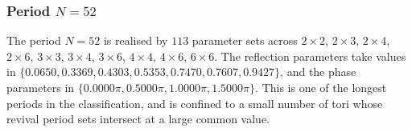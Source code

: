 \par
\subsubsection{Period $N = 52$}
The period $N=52$ is realised by $113$ parameter sets across $2\times2$, $2\times3$, $2\times4$, $2\times6$, $3\times3$, $3\times4$, $3\times6$, $4\times4$, $4\times6$, $6\times6$. The reflection parameters take values in $\{0.0650, 0.3369, 0.4303, 0.5353, 0.7470, 0.7607, 0.9427\}$, and the phase parameters in $\{0.0000\pi, 0.5000\pi, 1.0000\pi, 1.5000\pi\}$. This is one of the longest periods in the classification,
and is confined to a small number of tori whose revival
period sets intersect at a large common value.
